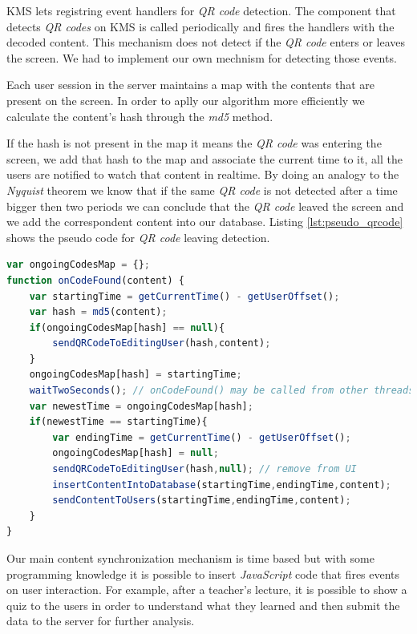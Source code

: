 	\ac{KMS} lets registring event handlers for \emph{QR code} detection. The component that detects \emph{QR codes} on \ac{KMS} is called periodically and fires the handlers with the decoded content. This mechanism does not detect if the \emph{QR code} enters or leaves the screen. We had to implement our own mechnism for detecting those events.

	Each user session in the server maintains a map with the contents that are present on the screen. In order to aplly our algorithm more efficiently we calculate the content's hash through the \emph{md5} method.

	If the hash is not present in the map it means the \emph{QR code} was entering the screen, we add that hash to the map and associate the current time to it, all the users are notified to watch that content in realtime. By doing an analogy to the \emph{Nyquist} theorem we know that if the same \emph{QR code} is not detected after a time bigger then two periods we can conclude that the \emph{QR code} leaved the screen and we add the correspondent content into our database. Listing \ref{lst:pseudo_qrcode} shows the pseudo code for \emph{QR code} leaving detection.

\begin{minipage}[!htb]{\linewidth}
\begin{lstlisting}[caption={Pseudo code for QR code leaving detection},label={lst:pseudo_qrcode},language=JavaScript]
var ongoingCodesMap = {};
function onCodeFound(content) {
	var startingTime = getCurrentTime() - getUserOffset();
	var hash = md5(content);
	if(ongoingCodesMap[hash] == null){
		sendQRCodeToEditingUser(hash,content);
	}
	ongoingCodesMap[hash] = startingTime;
	waitTwoSeconds(); // onCodeFound() may be called from other threads
	var newestTime = ongoingCodesMap[hash]; 
	if(newestTime == startingTime){
		var endingTime = getCurrentTime() - getUserOffset();
		ongoingCodesMap[hash] = null; 
		sendQRCodeToEditingUser(hash,null); // remove from UI
		insertContentIntoDatabase(startingTime,endingTime,content);
		sendContentToUsers(startingTime,endingTime,content);
	}
}
\end{lstlisting}
\end{minipage}


	Our main content synchronization mechanism is time based but with some programming knowledge it is possible to insert \emph{JavaScript} code that fires events on user interaction. For example, after a teacher's lecture, it is possible to show a quiz to the users in order to understand what they learned and then submit the data to the server for further analysis.


